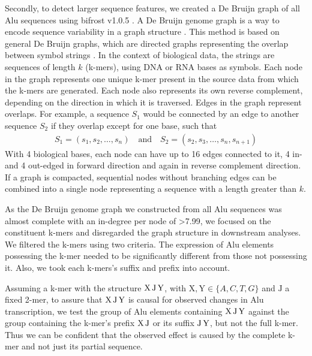 \noindent Secondly,\label{mar:alugraph} to detect
larger sequence features, we created a De Bruijn graph of all Alu sequences
using bifrost v1.0.5 \citep{Holley2020}. A De Bruijn genome graph is a way to
encode sequence variability in a graph structure \citep{Chikhi2014}. This
method is based on general De Bruijn graphs, which are directed graphs
representing the overlap between symbol strings
\citep{Sainte-Marie1894,DeBruijn1946,Good1946}. In the context of biological
data, the strings are sequences of length $k$ (k-mers), using DNA or RNA bases
as symbols. Each node in the graph represents one unique k-mer present in the
source data from which the k-mers are generated. Each node also represents its
own reverse complement, depending on the direction in which it is traversed.
Edges in the graph represent overlaps. For example, a sequence $S_{1}$ would
be connected by an edge to another sequence $S_{2}$ if they overlap except for
one base, such that
\begin{align*}
S_{1}=\left(s_{1},s_{2},\ldots,s_{n}\right)
  \quad\text{and}\quad
  S_{2}=\left(s_{2},s_{3},\ldots,s_{n},s_{n+1}\right)
\end{align*}
With \num{4} biological bases, each node can have up to \num{16} edges
connected to it, \num{4} in- and \num{4} out-edged in forward direction and
again in reverse complement direction. If a graph is compacted, sequential
nodes without branching edges can be combined into a single node representing
a sequence with a length greater than $k$.

As the De Bruijn genome graph we constructed from all Alu sequences was almost
complete with an in-degree per node of \num{>7.99}, we focused on the
constituent k-mers and disregarded the graph structure in downstream analyses.
We filtered the k-mers using two criteria. The expression of Alu elements
possessing the k-mer needed to be significantly different from those not
possessing it. Also, we took each k-mers's suffix and prefix into account.

Assuming a k-mer with the structure $\text{X\,J\,Y}$, with
$\text{X},\text{Y}\in\{A,C,T,G\}$ and $\text{J}$ a fixed 2-mer, to assure that
$\text{X\,J\,Y}$ is causal for observed changes in Alu transcription, we test
the group of Alu elements containing $\text{X\,J\,Y}$ against the group
containing the k-mer's prefix $\text{X\,J}$ or its suffix $\text{J\,Y}$, but
not the full k-mer. Thus we can be confident that the observed effect is
caused by the complete k-mer and not just its partial sequence.

